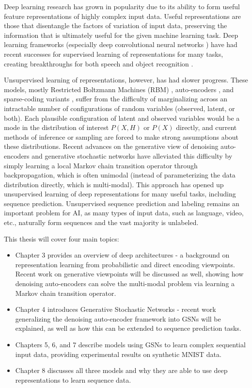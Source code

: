 Deep learning research has grown in popularity due to its ability to form useful feature representations of highly complex input data. Useful representations are those that disentangle the factors of variation of input data, preserving the information that is ultimately useful for the given machine learning task. Deep learning frameworks (especially deep convolutional neural networks \cite{lenet5}) have had recent successes for supervised learning of representations for many tasks, creating breakthroughs for both speech and object recognition \cite{seide11, krizhevsky12}.

Unsupervised learning of representations, however, has had slower progress. These models, mostly Restricted Boltzmann Machines (RBM) \cite{hinton06}, auto-encoders \cite{alain12}, and sparse-coding variants \cite{ranzato07}, suffer from the difficulty of marginalizing across an intractable number of configurations of random variables (observed, latent, or both). Each plausible configuration of latent and observed variables would be a mode in the distribution of interest \(P(X,H)\) or \(P(X)\) directly, and current methods of inference or sampling are forced to make strong assumptions about these distributions. Recent advances on the generative view of denoising auto-encoders and generative stochastic networks \cite{gsn} have alleviated this difficulty by simply learning a local Markov chain transition operator through backpropagation, which is often unimodal (instead of parameterizing the data distribution directly, which is multi-modal). This approach has opened up unsupervised learning of deep representations for many useful tasks, including sequence prediction. Unsupervised sequence prediction and labeling remains an important problem for AI, as many types of input data, such as language, video, etc., naturally form sequences and the vast majority is unlabeled.

This thesis will cover four main topics:
\begin{itemize}
	\item Chapter 3 provides an overview of deep architectures - a background on representation learning from probabilistic and direct encoding viewpoints. Recent work on generative viewpoints will be discussed as well, showing how denoising auto-encoders can solve the multi-modal problem via learning a Markov chain transition operator.
	\item Chapter 4 introduces Generative Stochastic Networks - recent work generalizing the denoising auto-encoder framework into GSNs will be explained, as well as how this can be extended to sequence prediction tasks.
	\item Chapters 5, 6, and 7 describe models using GSNs to learn complex sequential input data, providing experimental results on synthetic MNIST data.
	\item Chapter 8 discusses all three models and why they are able to use deep representations to learn sequence data.
\end{itemize}
